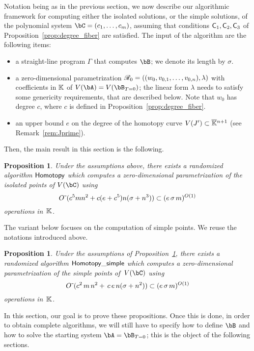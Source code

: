 \documentclass[12pt]{article}
\newtheorem{proposition}[definition]{Proposition}
\begin{document}
Notation being as in the previous section, we now describe our
algorithmic framework for computing either the isolated solutions, or
the simple solutions, of the polynomial system $\bC=(c_1,\dots,c_m)$,
assuming that conditions $\mathsf{C}_1,\mathsf{C}_2,\mathsf{C}_3$ of
Proposition~\ref{prop:degree_fiber} are satisfied. The input of the algorithm
are the following items:
\begin{itemize}
\item a straight-line program $\Gamma$ that computes $\bB$; we denote
  its length by $\sigma$.
\item a zero-dimensional parametrization $\mathscr{R}_0
  =((w_{0},v_{0,1},\dots,v_{0,n}),\lambda)$ with coefficients in $\mathbb{K}$
  of $V(\bA)=V(\bB_{T=0})$; the linear form $\lambda$ needs to satisfy some
  genericity requirements, that are described below. Note that $w_0$
  has degree $c$, where $c$ is defined in
  Proposition~\ref{prop:degree_fiber}.
\item an upper bound $e$ on the degree of the homotopy curve $V(J')
  \subset \overline{\mathbb{K}}{}^{n+1}$ (see Remark~\ref{rem:Jprime}).
\end{itemize}
Then, the main result in this section is the following.
\begin{proposition}\label{prop:compute_isolated}
  Under the assumptions above, there exists a randomized algorithm
  ${\sf Homotopy}$ which computes a zero-dimensional parametrization
  of the isolated points of $V(\bC)$ using
  $${O}{\,\tilde{ }\,}(c^5 m n^2  + c(e+c^5) n(\sigma + n^3)) \subset (e\,\sigma\,m)^{O(1)}$$
  operations in~$\mathbb{K}$. 
\end{proposition}
The variant below focuses on the computation of simple points. We
reuse the notations introduced above.
\begin{proposition}\label{prop:compute_regular}
  Under the assumptions of Proposition~\ref{prop:compute_isolated},
  there exists a randomized algorithm ${\sf Homotopy\_simple}$ which
  computes a zero-dimensional parametrization of the simple points
  of~$V(\bC)$ using
  $${O}{\,\tilde{ }\,}( c^2\, m \,n^2 + \,c\,e\,n (\sigma+n^2) )\subset (e\,\sigma\,m)^{O(1)}$$
  operations in~$\mathbb{K}$.
\end{proposition}
In this section, our goal is to prove these propositions. Once this is
done, in order to obtain complete algorithms, we will still have to
specify how to define $\bB$ and how to solve the starting system
$\bA=\bB_{T=0}$; this is the object of the following sections.
\end{document}
